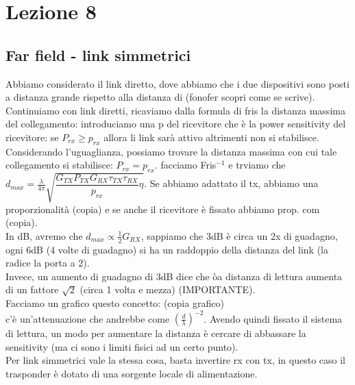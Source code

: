 \documentclass[oneside, 12pt]{extbook}
\begin{document}
\chapter{Lezione 8}
\section{Far field - link simmetrici}
Abbiamo considerato il link diretto, dove abbiamo che i due dispositivi sono posti a distanza grande rispetto alla distanza di (fonofer scopri come se scrive).\\Continuiamo con link diretti, ricaviamo dalla formula di fris la distanza massima del collegamento: introduciamo una p del ricevitore che è la power sensitivity del ricevitore: se $P_{rx} \geq p_{rx}$ allora li link sarà attivo altrimenti non si stabilisce.\\Considerando l'uguaglianza, possiamo trovare la distanza massima con cui tale collegamento si stabilisce: $P_{rx} = p_{rx}$. facciamo Fris$^{-1}$ e trviamo che $d_{max} = \frac{\lambda}{4\pi} \sqrt{\dfrac{G_{TX} P_{TX}G_{RX}\tau_{TX} \tau_{RX}}{p_{rx}} \eta}$. Se abbiamo adattato il tx, abbiamo una proporzionalità (copia) e se anche il ricevitore è fissato abbiamo prop. com (copia).\\In dB, avremo che $d_{max} \propto \frac{1}{2} G_{RX}$, sappiamo che 3dB è circa un 2x di guadagno, ogni 6dB (4 volte di guadagno) si ha un raddoppio della distanza del link (la radice la porta a 2).\\Invece, un aumento di guadagno di 3dB dice che òa distanza di lettura aumenta di un fattore $\sqrt{2}$ (circa 1 volta e mezza) (IMPORTANTE).\\Facciamo un grafico questo concetto: (copia grafico)\\c'è un'attenuazione che andrebbe come $(\frac{d}{\lambda})^{-2}$. Avendo quindi fissato il sistema di lettura, un modo per aumentare la distanza è cercare di abbassare la sensitivity (ma ci sono i limiti fisici ad un certo punto).\\Per link simmetrici vale la stessa cosa, basta invertire rx con tx, in questo caso il trasponder è dotato di una sorgente locale di alimentazione.
\end{document}
